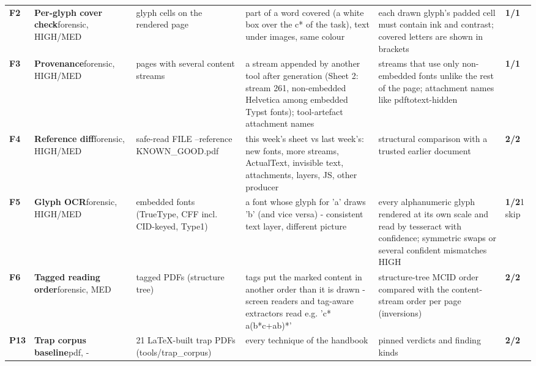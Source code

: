 \documentclass[10pt,a4paper]{article}
\begin{document}
\begin{longtable}{@{}P{0.6cm}P{2.6cm}P{3.1cm}P{4.4cm}P{4.4cm}P{1.4cm}@{}}
\textbf{F2} & \textbf{Per-glyph cover check}\newline\footnotesize forensic, HIGH/MED & \footnotesize glyph cells on the rendered page & \footnotesize part of a word covered (a white box over the c* of the task), text under images, same colour & \footnotesize each drawn glyph's padded cell must contain ink and contrast; covered letters are shown in brackets & \textcolor{ok}{\textbf{1/1}}\\
\textbf{F3} & \textbf{Provenance}\newline\footnotesize forensic, HIGH/MED & \footnotesize pages with several content streams & \footnotesize a stream appended by another tool after generation (Sheet 2: stream 261, non-embedded Helvetica among embedded Typst fonts); tool-artefact attachment names & \footnotesize streams that use only non-embedded fonts unlike the rest of the page; attachment names like pdftotext-hidden & \textcolor{ok}{\textbf{1/1}}\\
\textbf{F4} & \textbf{Reference diff}\newline\footnotesize forensic, HIGH/MED & \footnotesize safe-read FILE --reference KNOWN\_GOOD.pdf & \footnotesize this week's sheet vs last week's: new fonts, more streams, ActualText, invisible text, attachments, layers, JS, other producer & \footnotesize structural comparison with a trusted earlier document & \textcolor{ok}{\textbf{2/2}}\\
\textbf{F5} & \textbf{Glyph OCR}\newline\footnotesize forensic, HIGH/MED & \footnotesize embedded fonts (TrueType, CFF incl. CID-keyed, Type1) & \footnotesize a font whose glyph for 'a' draws 'b' (and vice versa) - consistent text layer, different picture & \footnotesize every alphanumeric glyph rendered at its own scale and read by tesseract with confidence; symmetric swaps or several confident mismatches HIGH & \textcolor{ok}{\textbf{1/2}}\newline\footnotesize 1 skip\\
\textbf{F6} & \textbf{Tagged reading order}\newline\footnotesize forensic, MED & \footnotesize tagged PDFs (structure tree) & \footnotesize tags put the marked content in another order than it is drawn - screen readers and tag-aware extractors read e.g. 'c* a(b*c+ab)*' & \footnotesize structure-tree MCID order compared with the content-stream order per page (inversions) & \textcolor{ok}{\textbf{2/2}}\\
\textbf{P13} & \textbf{Trap corpus baseline}\newline\footnotesize pdf, - & \footnotesize 21 LaTeX-built trap PDFs (tools/trap\_corpus) & \footnotesize every technique of the handbook & \footnotesize pinned verdicts and finding kinds & \textcolor{ok}{\textbf{2/2}}\\

\end{longtable}
\end{document}
